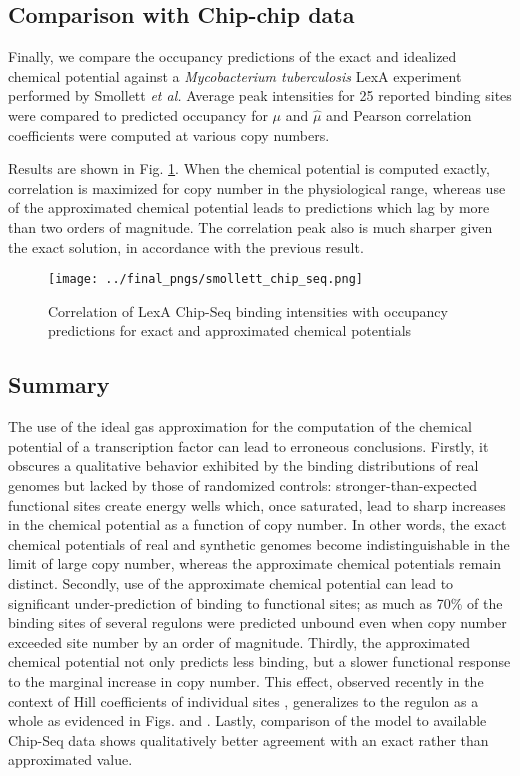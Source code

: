 \documentclass{article}
\begin{document}
\subsection{Comparison with Chip-chip data}
Finally, we compare the occupancy predictions of the exact and
idealized chemical potential against a \textit{Mycobacterium
  tuberculosis} LexA experiment performed by Smollett \textit{et al.}
\cite{smollett12} Average peak intensities for 25 reported binding
sites were compared to predicted occupancy for $\mu$ and $\hat\mu$ and
Pearson correlation coefficients were computed at various copy
numbers.

Results are shown in Fig. \ref{fig:smollett_chip_seq}.  When the
chemical potential is computed exactly, correlation is maximized for
copy number in the physiological range, whereas use of the
approximated chemical potential leads to predictions which lag by more
than two orders of magnitude.  The correlation peak also is much
sharper given the exact solution, in accordance with the previous
result.


\begin{figure}[ht]
  \centering
  \texttt{[image: ../final\_pngs/smollett\_chip\_seq.png]}
  \caption{Correlation of LexA Chip-Seq binding intensities with occupancy predictions for exact and approximated chemical potentials}
  \label{fig:smollett_chip_seq}
\end{figure}

\subsection{Summary}
The use of the ideal gas approximation for the computation of the
chemical potential of a transcription factor can lead to erroneous
conclusions.  Firstly, it obscures a qualitative behavior exhibited by
the binding distributions of real genomes but lacked by those of
randomized controls: stronger-than-expected functional sites create
energy wells which, once saturated, lead to sharp increases in the
chemical potential as a function of copy number.  In other words, the
exact chemical potentials of real and synthetic genomes become
indistinguishable in the limit of large copy number, whereas the
approximate chemical potentials remain distinct.  Secondly, use of the
approximate chemical potential can lead to significant
under-prediction of binding to functional sites; as much as 70\% of
the binding sites of several regulons were predicted unbound even when
copy number exceeded site number by an order of magnitude.  Thirdly,
the approximated chemical potential not only predicts less binding,
but a slower functional response to the marginal increase in copy
number.  This effect, observed recently in the context of Hill
coefficients of individual sites \cite{sheinman12}, generalizes to the
regulon as a whole as evidenced in
Figs. \label{fig:occupancy_vs_copy_number}
and \label{fig:occupancy_vs_copy_number_examples}.  Lastly, comparison
of the model to available Chip-Seq data shows qualitatively better
agreement with an exact rather than approximated value.



 \newpage
{}
 \newpage
\end{document}
